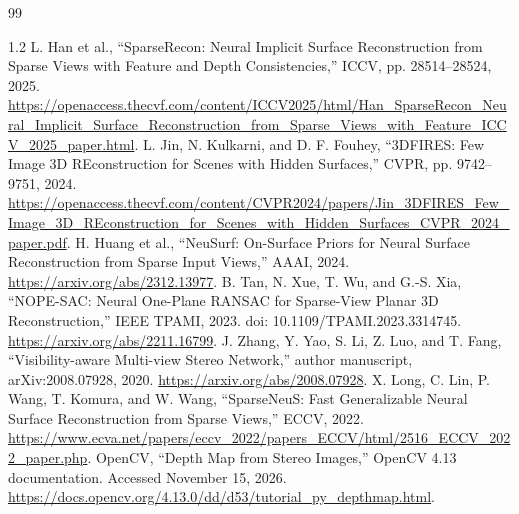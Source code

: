 \clearpage
\renewcommand{\bibname}{References}
\begin{thebibliography}{99}
\begin{spacing}{1.2}
 L. Han et al., ``SparseRecon: Neural Implicit Surface Reconstruction from Sparse Views with Feature and Depth Consistencies,'' ICCV, pp. 28514--28524, 2025. \url{https://openaccess.thecvf.com/content/ICCV2025/html/Han_SparseRecon_Neural_Implicit_Surface_Reconstruction_from_Sparse_Views_with_Feature_ICCV_2025_paper.html}.
 L. Jin, N. Kulkarni, and D. F. Fouhey, ``3DFIRES: Few Image 3D REconstruction for Scenes with Hidden Surfaces,'' CVPR, pp. 9742--9751, 2024. \url{https://openaccess.thecvf.com/content/CVPR2024/papers/Jin_3DFIRES_Few_Image_3D_REconstruction_for_Scenes_with_Hidden_Surfaces_CVPR_2024_paper.pdf}.
 H. Huang et al., ``NeuSurf: On-Surface Priors for Neural Surface Reconstruction from Sparse Input Views,'' AAAI, 2024. \url{https://arxiv.org/abs/2312.13977}.
 B. Tan, N. Xue, T. Wu, and G.-S. Xia, ``NOPE-SAC: Neural One-Plane RANSAC for Sparse-View Planar 3D Reconstruction,'' IEEE TPAMI, 2023. doi: 10.1109/TPAMI.2023.3314745. \url{https://arxiv.org/abs/2211.16799}.
 J. Zhang, Y. Yao, S. Li, Z. Luo, and T. Fang, ``Visibility-aware Multi-view Stereo Network,'' author manuscript, arXiv:2008.07928, 2020. \url{https://arxiv.org/abs/2008.07928}.
 X. Long, C. Lin, P. Wang, T. Komura, and W. Wang, ``SparseNeuS: Fast Generalizable Neural Surface Reconstruction from Sparse Views,'' ECCV, 2022. \url{https://www.ecva.net/papers/eccv_2022/papers_ECCV/html/2516_ECCV_2022_paper.php}.
 OpenCV, ``Depth Map from Stereo Images,'' OpenCV 4.13 documentation. Accessed November 15, 2026. \url{https://docs.opencv.org/4.13.0/dd/d53/tutorial_py_depthmap.html}.
\end{spacing}
\end{thebibliography}
